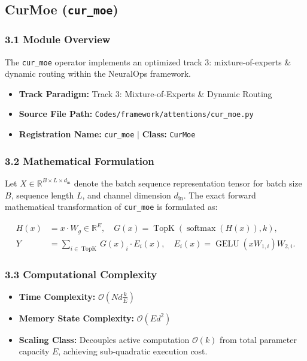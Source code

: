 \subsection{CurMoe (\texttt{cur\_moe})}
\label{sec:app_module_cur_moe}

\subsubsection*{3.1 Module Overview}
The \texttt{cur\_moe} operator implements an optimized track 3: mixture-of-experts \& dynamic routing within the NeuralOps framework.
\begin{itemize}
    \item \textbf{Track Paradigm:} Track 3: Mixture-of-Experts \& Dynamic Routing
    \item \textbf{Source File Path:} \texttt{Codes/framework/attentions/cur\_moe.py}
    \item \textbf{Registration Name:} \texttt{cur\_moe} $\mid$ \textbf{Class:} \texttt{CurMoe}
\end{itemize}

\subsubsection*{3.2 Mathematical Formulation}
Let $X \in \mathbb{R}^{B \times L \times d_{\text{in}}}$ denote the batch sequence representation tensor for batch size $B$, sequence length $L$, and channel dimension $d_{\text{in}}$. The exact forward mathematical transformation of \texttt{cur\_moe} is formulated as:

\begin{align}
H(x) &= x \cdot W_g \in \mathbb{R}^{E}, \quad G(x) = \operatorname{TopK}\left(\operatorname{softmax}(H(x)), k\right), \\
Y &= \sum_{i \in \operatorname{TopK}} G(x)_i \cdot E_i(x), \quad E_i(x) = \operatorname{GELU}(x W_{1, i}) W_{2, i}.
\end{align}


\subsubsection*{3.3 Computational Complexity}
\begin{itemize}
    \item \textbf{Time Complexity:} $\mathcal{O}(N d \frac{k}{E})$
    \item \textbf{Memory State Complexity:} $\mathcal{O}(E d^2)$
    \item \textbf{Scaling Class:} Decouples active computation $\mathcal{O}(k)$ from total parameter capacity $E$, achieving sub-quadratic execution cost.
\end{itemize}

